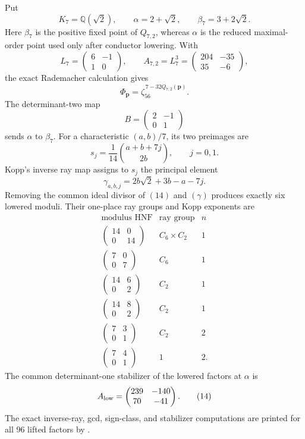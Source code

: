 \documentclass[11pt]{article}
\newcommand{\Q}{\mathbb Q}
\begin{document}
Put
\[
 K_7=\Q(\sqrt2),\qquad
 \alpha=2+\sqrt2,\qquad
 \beta_7=3+2\sqrt2.
\]
Here $\beta_7$ is the positive fixed point of $Q_{7,2}$, whereas
$\alpha$ is the reduced maximal-order point used only after conductor
lowering.  With
\[
 L_7=\begin{pmatrix}6&-1\\1&0\end{pmatrix},\qquad
 A_{7,2}=L_7^3=\begin{pmatrix}204&-35\\35&-6\end{pmatrix},
\]
the exact Rademacher calculation gives
\[
 \Phi_{\boldsymbol p}
 =\zeta_{56}^{\,7-32Q_{7,2}(\boldsymbol p)}.
\]
The determinant-two map
\[
 B=\begin{pmatrix}2&-1\\0&1\end{pmatrix}
\]
sends $\alpha$ to $\beta_7$.  For a characteristic $(a,b)/7$, its two
preimages are
\[
 s_j=\frac1{14}\binom{a+b+7j}{2b},\qquad j=0,1.
\tag{11}
\]
Kopp's inverse ray map assigns to $s_j$ the principal element
\[
 \gamma_{a,b,j}=2b\sqrt2+3b-a-7j.
\tag{12}
\]
Removing the common ideal divisor of $(14)$ and $(\gamma)$ produces
exactly six lowered moduli.  Their one-place ray groups and Kopp
exponents are
\[
\begin{array}{c|c|c}
\text{modulus HNF}&\text{ray group}&n\\ \hline
\left(\begin{smallmatrix}14&0\\0&14\end{smallmatrix}\right)&C_6\times C_2&1\\
\left(\begin{smallmatrix}7&0\\0&7\end{smallmatrix}\right)&C_6&1\\
\left(\begin{smallmatrix}14&6\\0&2\end{smallmatrix}\right)&C_2&1\\
\left(\begin{smallmatrix}14&8\\0&2\end{smallmatrix}\right)&C_2&1\\
\left(\begin{smallmatrix}7&3\\0&1\end{smallmatrix}\right)&C_2&2\\
\left(\begin{smallmatrix}7&4\\0&1\end{smallmatrix}\right)&1&2.
\end{array}
\tag{13}
\]
The common determinant-one stabilizer of the lowered factors at
$\alpha$ is
\[
 A_{\rm low}=\begin{pmatrix}239&-140\\70&-41\end{pmatrix}.
\tag{14}
\]
The exact inverse-ray, gcd, sign-class, and stabilizer computations are
printed for all $96$ lifted factors by
.
\end{document}
